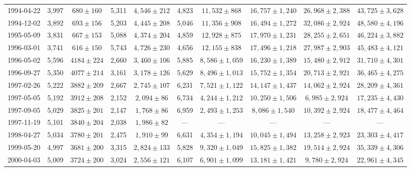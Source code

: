 \begin{landscape}
\begin{longtable}{cccccccccc}
{1994-04-22} & 3,997 & {$680  \pm  160$} & 5,311 & {$4,546 \pm 212$} & 4,823 & {$11,532 \pm 868$} & {$16,757 \pm 1,240$} & {$26,968 \pm 2,388$} & {$43,725 \pm 3,628$} \\
{1994-12-02} & 3,892 & {$693  \pm  156$} & 5,203 & {$4,445 \pm 208$} & 5,046 & {$11,356 \pm 908$} & {$16,494 \pm 1,272$} & {$32,086 \pm 2,924$} & {$48,580 \pm 4,196$} \\
{1995-05-09} & 3,831 & {$667  \pm  153$} & 5,088 & {$4,374 \pm 204$} & 4,859 & {$12,928 \pm 875$} & {$17,970 \pm 1,231$} & {$28,255 \pm 2,651$} & {$46,224 \pm 3,882$} \\
{1996-03-01} & 3,741 & {$616  \pm  150$} & 5,743 & {$4,726 \pm 230$} & 4,656 & {$12,155 \pm 838$} & {$17,496 \pm 1,218$} & {$27,987 \pm 2,903$} & {$45,483 \pm 4,121$} \\
{1996-05-02} & 5,596 & {$4184  \pm  224$} & 2,660 & {$3,460 \pm 106$} & 5,885 & {$8,586 \pm 1,059$} & {$16,230 \pm 1,389$} & {$15,480 \pm 2,912$} & {$31,710 \pm 4,301$} \\
{1996-09-27} & 5,350 & {$4077  \pm  214$} & 3,161 & {$3,178 \pm 126$} & 5,629 & {$8,496 \pm 1,013$} & {$15,752 \pm 1,354$} & {$20,713 \pm 2,921$} & {$36,465 \pm 4,275$} \\
{1997-02-26} & 5,222 & {$3882  \pm  209$} & 2,667 & {$2,745 \pm 107$} & 6,231 & {$7,521 \pm 1,122$} & {$14,147 \pm 1,437$} & {$14,062 \pm 2,924$} & {$28,209 \pm 4,361$} \\
{1997-05-05} & 5,192 & {$3912  \pm  208$} & 2,152 & {$2,094 \pm 86$} & 6,734 & {$4,244 \pm 1,212$} & {$10,250 \pm 1,506$} & {$6,985 \pm 2,924$} & {$17,235 \pm 4,430$} \\
{1997-09-05} & 5,029 & {$3825  \pm  201$} & 2,147 & {$1,768 \pm 86$} & 6,959 & {$2,493 \pm 1,253$} & {$8,086 \pm 1,540$} & {$10,392 \pm 2,924$} & {$18,477 \pm 4,464$} \\
{1997-11-19} & 5,101 & {$3840  \pm  204$} & 2,038 & {$1,986 \pm 82$} & --- & --- & --- & --- & --- \\
{1998-04-27} & 5,034 & {$3780  \pm  201$} & 2,475 & {$1,910 \pm 99$} & 6,631 & {$4,354 \pm 1,194$} & {$10,045 \pm 1,494$} & {$13,258 \pm 2,923$} & {$23,303 \pm 4,417$} \\
{1999-05-20} & 4,997 & {$3681  \pm  200$} & 3,315 & {$2,824 \pm 133$} & 5,828 & {$9,320 \pm 1,049$} & {$15,825 \pm 1,382$} & {$19,514 \pm 2,924$} & {$35,339 \pm 4,306$} \\
{2000-04-03} & 5,009 & {$3724  \pm  200$} & 3,024 & {$2,556 \pm 121$} & 6,107 & {$6,901 \pm 1,099$} & {$13,181 \pm 1,421$} & {$9,780 \pm 2,924$} & {$22,961 \pm 4,345$} \\

\end{longtable}
\end{landscape}
